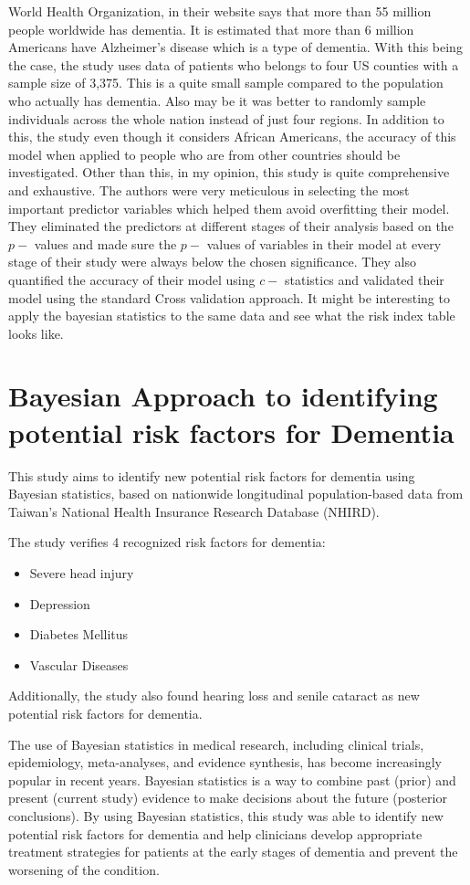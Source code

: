 \documentclass[12pt,letterpaper]{article}
\begin{document}
World Health Organization, in their website says that more than 55 million people worldwide has dementia. It is estimated that more than 6 million Americans have Alzheimer's disease which is a type of dementia. With this being the case, the study uses data of patients who belongs to four US counties with a sample size of 3,375. This is a quite small sample compared to the population who actually has dementia. Also may be it was better to randomly sample individuals across the whole nation instead of just four regions. In addition to this, the study even though it considers African Americans, the accuracy of this model when applied to people who are from other countries should be investigated.  Other than this, in my opinion, this study is quite comprehensive and exhaustive. The authors were very meticulous in selecting the most important predictor variables which helped them avoid overfitting their model. They eliminated the predictors at different stages of their analysis based on the $p-$ values and made sure the $p-$ values of variables in their model at every stage of their study were always below the chosen significance. They also quantified the accuracy of their model using $c-$ statistics and validated their model using the standard Cross validation approach. It might be interesting to apply the bayesian statistics to the same data and see what the risk index table looks like.


\section{Bayesian Approach to identifying potential risk factors for Dementia}
This study aims to identify new potential risk factors for dementia using Bayesian statistics, based on nationwide longitudinal population-based data from Taiwan's National Health Insurance Research Database (NHIRD).

The study verifies 4 recognized risk factors for dementia:
\begin{itemize}
\item Severe head injury
\item Depression
\item Diabetes Mellitus
\item Vascular Diseases
\end{itemize}

Additionally, the study also found hearing loss and senile cataract as new potential risk factors for dementia.


The use of Bayesian statistics in medical research, including clinical trials, epidemiology, meta-analyses, and evidence synthesis, has become increasingly popular in recent years. Bayesian statistics is a way to combine past (prior) and present (current study) evidence to make decisions about the future (posterior conclusions). By using Bayesian statistics, this study was able to identify new potential risk factors for dementia and help clinicians develop appropriate treatment strategies for patients at the early stages of dementia and prevent the worsening of the condition.
\end{document}
